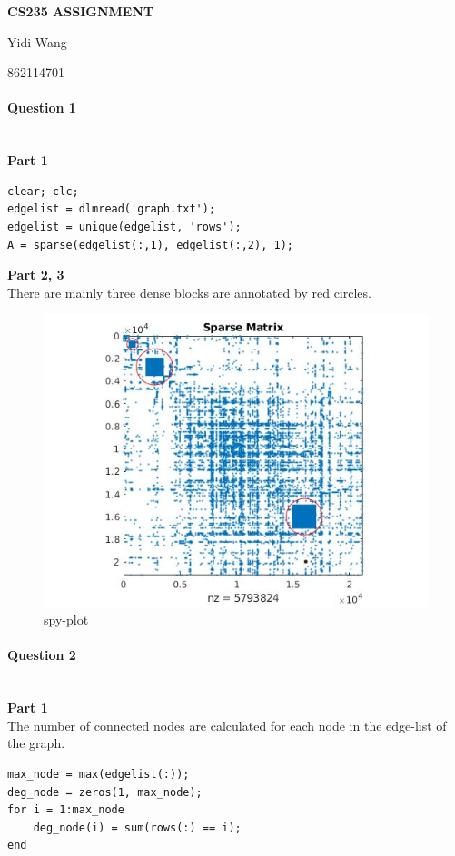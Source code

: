 \documentclass[11pt]{article}
\begin{document}
\centerline{\large \bf CS235 ASSIGNMENT}
\centerline{Yidi Wang}
\centerline{862114701}

\vskip 0.1in


\paragraph{Question 1}\mbox{} \\
\noindent
\textbf{Part 1}
\begin{verbatim}
clear; clc;
edgelist = dlmread('graph.txt');
edgelist = unique(edgelist, 'rows');
A = sparse(edgelist(:,1), edgelist(:,2), 1);
\end{verbatim}

\noindent
\textbf{Part 2, 3} \\
There are mainly three dense blocks are annotated by red circles.
\begin{figure}[H]
    \centering
    \includegraphics[scale=0.56]{figs/q1.jpg}
    \caption{spy-plot}
    \label{fig::spy}
\end{figure}

\paragraph{Question 2}\mbox{} \\
\noindent
\textbf{Part 1} \\
The number of connected nodes are calculated for each node in the edge-list of the graph.
\begin{verbatim}
max_node = max(edgelist(:));
deg_node = zeros(1, max_node);
for i = 1:max_node
    deg_node(i) = sum(rows(:) == i);
end
\end{verbatim}
\end{document}
